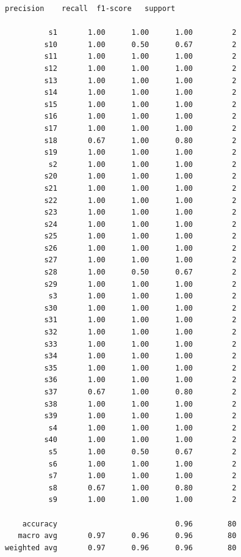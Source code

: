 \documentclass[11pt]{article}
\begin{document}
    \begin{Verbatim}[commandchars=\\\{\}]
              precision    recall  f1-score   support

          s1       1.00      1.00      1.00         2
         s10       1.00      0.50      0.67         2
         s11       1.00      1.00      1.00         2
         s12       1.00      1.00      1.00         2
         s13       1.00      1.00      1.00         2
         s14       1.00      1.00      1.00         2
         s15       1.00      1.00      1.00         2
         s16       1.00      1.00      1.00         2
         s17       1.00      1.00      1.00         2
         s18       0.67      1.00      0.80         2
         s19       1.00      1.00      1.00         2
          s2       1.00      1.00      1.00         2
         s20       1.00      1.00      1.00         2
         s21       1.00      1.00      1.00         2
         s22       1.00      1.00      1.00         2
         s23       1.00      1.00      1.00         2
         s24       1.00      1.00      1.00         2
         s25       1.00      1.00      1.00         2
         s26       1.00      1.00      1.00         2
         s27       1.00      1.00      1.00         2
         s28       1.00      0.50      0.67         2
         s29       1.00      1.00      1.00         2
          s3       1.00      1.00      1.00         2
         s30       1.00      1.00      1.00         2
         s31       1.00      1.00      1.00         2
         s32       1.00      1.00      1.00         2
         s33       1.00      1.00      1.00         2
         s34       1.00      1.00      1.00         2
         s35       1.00      1.00      1.00         2
         s36       1.00      1.00      1.00         2
         s37       0.67      1.00      0.80         2
         s38       1.00      1.00      1.00         2
         s39       1.00      1.00      1.00         2
          s4       1.00      1.00      1.00         2
         s40       1.00      1.00      1.00         2
          s5       1.00      0.50      0.67         2
          s6       1.00      1.00      1.00         2
          s7       1.00      1.00      1.00         2
          s8       0.67      1.00      0.80         2
          s9       1.00      1.00      1.00         2

    accuracy                           0.96        80
   macro avg       0.97      0.96      0.96        80
weighted avg       0.97      0.96      0.96        80

    \end{Verbatim}
\end{document}
